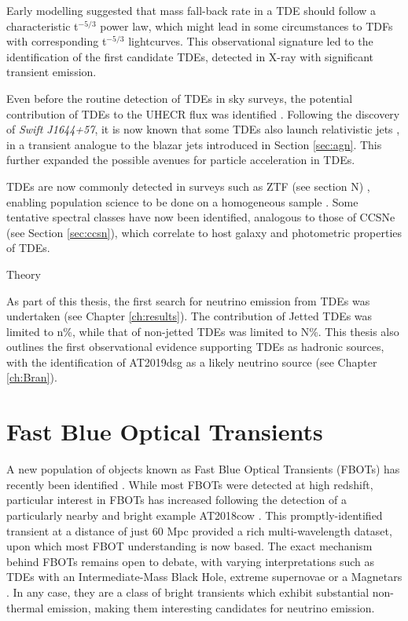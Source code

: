 Early modelling  suggested that mass fall-back rate in a TDE should follow a characteristic t$^{-5/3}$ power law, which might lead in some circumstances to TDFs with corresponding t$^{-5/3}$ lightcurves. This observational signature led to the identification  of the first candidate TDEs, detected in X-ray with significant transient emission.

Even before the routine detection of TDEs in sky surveys, the potential contribution of TDEs to the UHECR flux was identified . Following the discovery of \emph{Swift J1644+57}, it is now known that some TDEs also launch relativistic jets , in a transient analogue to the blazar jets introduced in Section \ref{sec:agn}. This further expanded the possible avenues for particle acceleration in TDEs.

TDEs are now commonly detected in surveys such as ZTF (see section N) , enabling population science to be done on a homogeneous sample . Some tentative spectral classes have now been identified, analogous to those of CCSNe (see Section \ref{sec:ccsn}), which correlate to host galaxy and photometric properties of TDEs. 

Theory

As part of this thesis, the first search for neutrino emission from TDEs was undertaken (see Chapter \ref{ch:results}). The contribution of Jetted TDEs was limited to n\%, while that of non-jetted TDEs was limited to N\%.  This thesis also outlines the first observational evidence supporting TDEs as hadronic sources, with the identification of AT2019dsg as a likely neutrino source (see Chapter \ref{ch:Bran}).

\section{Fast Blue Optical Transients}

A new population of objects known as Fast Blue Optical Transients (FBOTs) has recently been identified . While most FBOTs were detected at high redshift, particular interest in FBOTs has increased following the detection of a particularly nearby and bright example AT2018cow . This promptly-identified transient at a distance of just 60 Mpc provided a rich multi-wavelength dataset, upon which most FBOT understanding is now based. The exact mechanism behind FBOTs remains open to debate, with varying interpretations such as TDEs with an Intermediate-Mass Black Hole, extreme supernovae or a Magnetars . In any case, they are a class of bright transients which exhibit substantial non-thermal emission, making them interesting candidates for neutrino emission.

